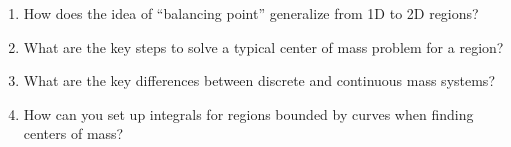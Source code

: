\begin{enumerate}
\item How does the idea of “balancing point” generalize from 1D to 2D regions?

\item What are the key steps to solve a typical center of mass problem for a region?

\item What are the key differences between discrete and continuous mass systems?

\item How can you set up integrals for regions bounded by curves when finding centers of mass?

\end{enumerate}
